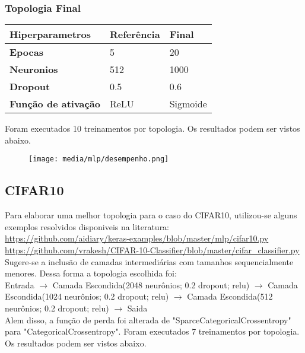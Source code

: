 \documentclass[a4paper]{article}
\begin{document}
\subsubsection{Topologia Final}
\begin{table}[H]
    \centering
    \begin{tabular}{|l|l|l|}
        \hline
        \textbf{Hiperparametros}    & \textbf{Referência} & \textbf{Final} \\ \hline
        \textbf{Epocas}             & 5                   & 20             \\ \hline
        \textbf{Neuronios}          & 512                 & 1000           \\ \hline
        \textbf{Dropout}            & 0.5                 & 0.6            \\ \hline
        \textbf{Função de ativação} & ReLU                & Sigmoide       \\ \hline
    \end{tabular}
\end{table}

Foram executados 10 treinamentos por topologia. Os resultados podem ser vistos abaixo.
\begin{figure}[H]
    \centering   %
    \centerline{\texttt{[image: media/mlp/desempenho.png]}}
    \label{fig:fig2}  %
\end{figure}

\subsection{CIFAR10}

Para elaborar uma melhor topologia para o caso do CIFAR10, utilizou-se alguns exemplos resolvidos disponiveis na literatura: \\
\url{https://github.com/aidiary/keras-examples/blob/master/mlp/cifar10.py} \\
\url{https://github.com/vrakesh/CIFAR-10-Classifier/blob/master/cifar_classifier.py} \\
Sugere-se a inclusão de camadas intermediárias com tamanhos sequencialmente menores. Dessa forma a topologia escolhida foi: \\
\break
Entrada $\rightarrow$ Camada Escondida(2048 neurônios; 0.2 dropout; relu) $\rightarrow$ Camada Escondida(1024 neurônios; 0.2 dropout; relu) $\rightarrow$ Camada Escondida(512 neurônios; 0.2 dropout; relu) $\rightarrow$ Saida \\
\break
Alem disso, a função de perda foi alterada de "SparceCategoricalCrossentropy" para "CategoricalCrossentropy".
Foram executados 7 treinamentos por topologia. Os resultados podem ser vistos abaixo.
\end{document}
